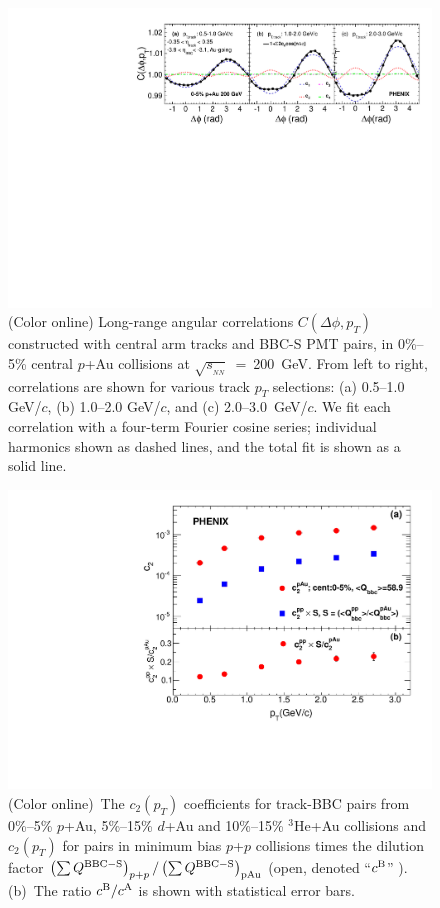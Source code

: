 \documentclass[%
reprint,
showpacs,preprintnumbers,
 amsmath,amssymb,
 aps,
]{revtex4-1}
\newcommand{\pt}{\mbox{$p_T$}\xspace}
\newcommand{\sqsn}{\mbox{$\sqrt{s_{_{NN}}}$}\xspace}
\newcommand{\dau}{\mbox{$d$+Au}\xspace}
\newcommand{\pau}{\mbox{$p$+Au}\xspace}
\newcommand{\hau}{\mbox{$^3\text{He}$+Au}\xspace}
\newcommand{\pp}{\mbox{$p$+$p$}\xspace}
\begin{document}
\begin{figure}[htbp]
  \includegraphics[scale=0.8]{Figures/figure1.pdf}
  \caption{(Color online) Long-range angular correlations $C(\Delta\phi,p_{T})$ constructed with central arm tracks and BBC-S PMT pairs, in 0\%--5\% central \pau collisions at \sqsn~=~200~GeV. From left to right,
correlations are shown for various track \pt selections: (a) 0.5--1.0 GeV/$c$, (b) 1.0--2.0 GeV/$c$, and (c) 2.0--3.0~GeV/$c$. We fit each correlation with a four-term Fourier cosine series; individual harmonics shown as dashed lines, and the total fit is shown as a solid line.}
\label{fig:figure1}
\end{figure}

\begin{figure}[htbp]
  \includegraphics[scale=0.45]{Figures/figure2.pdf}
  \caption{(Color online)~The $c_2(p_T)$ coefficients for track-BBC pairs from 
0\%--5\% \pau, 5\%--15\% \dau and 10\%--15\% \hau collisions and
$c_{2}(p_{T})$ for pairs in minimum bias \pp collisions times the dilution
factor $\left( \sum Q^{{\rm BBC-S}} \right)_{p+p} / \left( \sum Q^{{\rm
BBC-S}} \right)_{{\rm pAu}}$ (open, denoted ``$c^{{\rm B}}$'' ). (b)~The
ratio $c^{{\rm B}}/c^{{\rm A}}$ is shown with statistical error bars.
}
\label{fig:figure2}
\end{figure}
\end{document}
